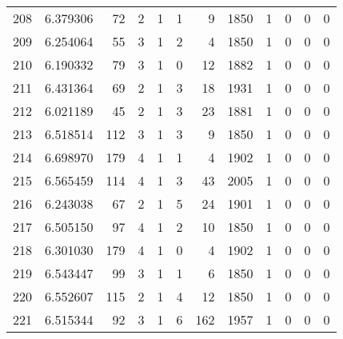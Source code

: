 \begin{tabular}{lrrrrrrrrrrr}
208 &  6.379306 &   72 &      2 &        1 &      1 &               9 &  1850 &               1 &               0 &               0 &               0 \\
209 &  6.254064 &   55 &      3 &        1 &      2 &               4 &  1850 &               1 &               0 &               0 &               0 \\
210 &  6.190332 &   79 &      3 &        1 &      0 &              12 &  1882 &               1 &               0 &               0 &               0 \\
211 &  6.431364 &   69 &      2 &        1 &      3 &              18 &  1931 &               1 &               0 &               0 &               0 \\
212 &  6.021189 &   45 &      2 &        1 &      3 &              23 &  1881 &               1 &               0 &               0 &               0 \\
213 &  6.518514 &  112 &      3 &        1 &      3 &               9 &  1850 &               1 &               0 &               0 &               0 \\
214 &  6.698970 &  179 &      4 &        1 &      1 &               4 &  1902 &               1 &               0 &               0 &               0 \\
215 &  6.565459 &  114 &      4 &        1 &      3 &              43 &  2005 &               1 &               0 &               0 &               0 \\
216 &  6.243038 &   67 &      2 &        1 &      5 &              24 &  1901 &               1 &               0 &               0 &               0 \\
217 &  6.505150 &   97 &      4 &        1 &      2 &              10 &  1850 &               1 &               0 &               0 &               0 \\
218 &  6.301030 &  179 &      4 &        1 &      0 &               4 &  1902 &               1 &               0 &               0 &               0 \\
219 &  6.543447 &   99 &      3 &        1 &      1 &               6 &  1850 &               1 &               0 &               0 &               0 \\
220 &  6.552607 &  115 &      2 &        1 &      4 &              12 &  1850 &               1 &               0 &               0 &               0 \\
221 &  6.515344 &   92 &      3 &        1 &      6 &             162 &  1957 &               1 &               0 &               0 &               0 \\

\end{tabular}
